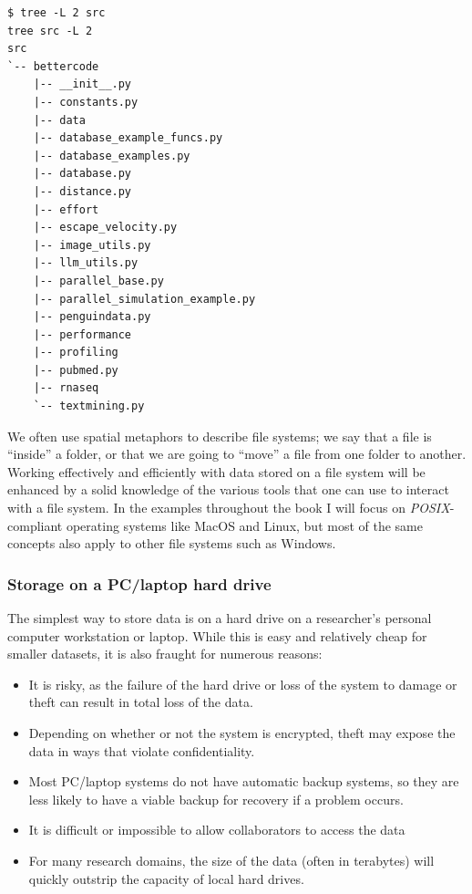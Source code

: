 \begin{lstlisting}[style=shell]
$ tree -L 2 src
tree src -L 2
src
`-- bettercode
    |-- __init__.py
    |-- constants.py
    |-- data
    |-- database_example_funcs.py
    |-- database_examples.py
    |-- database.py
    |-- distance.py
    |-- effort
    |-- escape_velocity.py
    |-- image_utils.py
    |-- llm_utils.py
    |-- parallel_base.py
    |-- parallel_simulation_example.py
    |-- penguindata.py
    |-- performance
    |-- profiling
    |-- pubmed.py
    |-- rnaseq
    `-- textmining.py
\end{lstlisting}

We often use spatial metaphors to describe file systems; we say that a file is ``inside'' a folder, or that we are going to ``move'' a file from one folder to another.  Working effectively and efficiently with data stored on a file system will be enhanced by a solid knowledge of the various tools that one can use to interact with a file system.  In the examples throughout the book I will focus on \textit{POSIX}-compliant operating systems like MacOS and Linux, but most of the same concepts also apply to other file systems such as Windows.

\subsubsection{Storage on a PC/laptop hard drive}

The simplest way to store data is on a hard drive on a researcher's personal computer workstation or laptop.  While this is easy and relatively cheap for smaller datasets, it is also fraught for numerous reasons:

\begin{itemize}
\item It is risky, as the failure of the hard drive or loss of the system to damage or theft can result in total loss of the data.
\item Depending on whether or not the system is encrypted, theft may expose the data in ways that violate confidentiality.
\item Most PC/laptop systems do not have automatic backup systems, so they are less likely to have a viable backup for recovery if a problem occurs.
\item It is difficult or impossible to allow collaborators to access the data
\item For many research domains, the size of the data (often in terabytes) will quickly outstrip the capacity of local hard drives.
\end{itemize}

